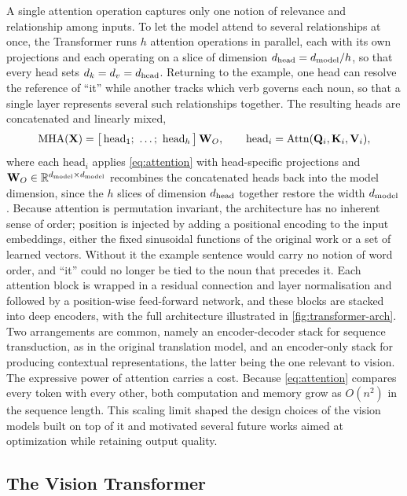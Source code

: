 A single attention operation captures only one notion of relevance and relationship among inputs. To let the model attend to several relationships at once, the Transformer runs $h$ attention operations in parallel, each with its own projections and each operating on a slice of dimension
$d_{\text{head}}=d_{\text{model}}/h$, so that every head sets $d_k=d_v=d_{\text{head}}$. Returning to the example, one head can resolve the reference of
``it'' while another tracks which verb governs each noun, so that a single layer
represents several such relationships together. The resulting heads are concatenated and linearly mixed,
\begin{equation}
  \mathrm{MHA}(\mathbf{X})
  = \big[\,\mathrm{head}_1;\ \dots;\ \mathrm{head}_h\,\big]\,\mathbf{W}_O,
  \qquad
  \mathrm{head}_i=\mathrm{Attn}(\mathbf{Q}_i,\mathbf{K}_i,\mathbf{V}_i),
  \label{eq:mha}
\end{equation}
where each $\mathrm{head}_i$ applies \cref{eq:attention} with head-specific
projections and $\mathbf{W}_O\in\mathbb{R}^{d_{\text{model}}\times d_{\text{model}}}$ recombines the concatenated
heads back into the model dimension, since the $h$ slices of dimension $d_{\text{head}}$ together
restore the width $d_{\text{model}}$. Because
attention is permutation invariant, the architecture has no inherent sense of order;
position is injected by adding a positional encoding to the input embeddings, either
the fixed sinusoidal functions of the original work or a set of learned vectors. Without
it the example sentence would carry no notion of word order, and ``it'' could no longer be
tied to the noun that precedes it. Each
attention block is wrapped in a residual connection and layer normalisation
\cite{vaswani2017attention} and followed by a position-wise feed-forward network,
and these blocks are stacked into deep encoders, with the full architecture illustrated in \cref{fig:transformer-arch}. Two arrangements are common, namely
an encoder-decoder stack for sequence transduction, as in the original translation
model, and an encoder-only stack for
producing contextual representations, the latter being the one relevant to vision.
The expressive power of attention carries a cost. Because
\cref{eq:attention} compares every token with every other, both computation and
memory grow as $O(n^2)$ in the sequence length. This scaling limit shaped the design choices 
of the vision models built on top of it and motivated several future works aimed at optimization 
while retaining output quality. 

\subsection{The Vision Transformer}
\label{subsec:vit}

